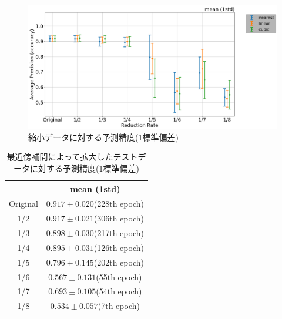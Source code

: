 \documentclass[a4j, 11pt]{jreport}
\begin{document}

\begin{figure}[H]
  \centering
  \includegraphics[width=1\hsize, keepaspectratio]{images/5syou/print_errorbar/print_errorbar_inter_comparison/acc_with_errorbar_syuron5_inter_comparison_900epoch_30run_300_acc_max_std1sigma.png}
  \caption{縮小データに対する予測精度(1標準偏差)}
  \label{fig:inter_comparison_300_1std}
\end{figure}

\begin{table}[H]
  \centering
	\caption{最近傍補間によって拡大したテストデータに対する予測精度(1標準偏差)}
  \begin{tabular}{|c|c|}
		\hline
    & mean (1std) \\ \hline
    Original & $0.917 \pm 0.020$(228th epoch) \\ \hline
    1/2 & $0.917 \pm 0.021$(306th epoch) \\ \hline
    1/3 & $0.898 \pm 0.030$(217th epoch) \\ \hline
    1/4 & $0.895 \pm 0.031$(126th epoch) \\ \hline
    1/5 & $0.796 \pm 0.145$(202th epoch) \\ \hline
    1/6 & $0.567 \pm 0.131$(55th epoch) \\ \hline
    1/7 & $0.693 \pm 0.105$(54th epoch) \\ \hline
    1/8 & $0.534 \pm 0.057$(7th epoch) \\ \hline
  \end{tabular}
  \label{tb:accs_4_2_nearest_1std}
\end{table}
\end{document}

